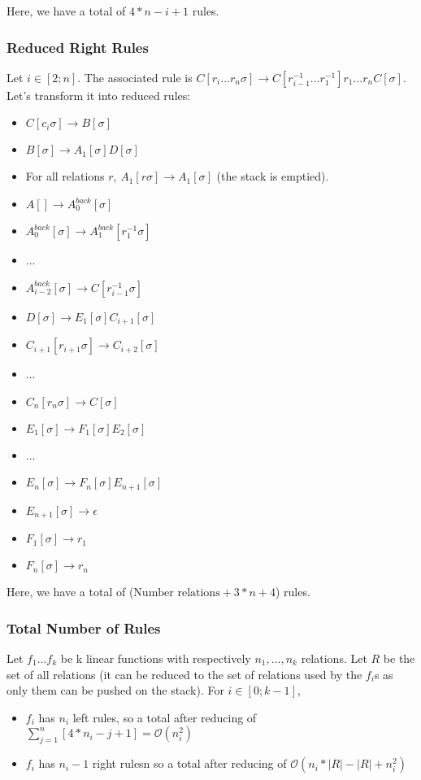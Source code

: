 \documentclass[10pt,a4paper,draft]{article}
\begin{document}
Here, we have a total of $4 * n - i + 1$ rules.

\subsubsection{Reduced Right Rules}
\label{reducedrightrules}

Let $i \in [2; n]$. The associated rule is $C[r_i ... r_n \sigma] \rightarrow C[r_{i-1}^{-1} ... r_1^{-1}] r_1 ... r_n C[\sigma]$. Let's transform it into reduced rules:
\begin{itemize}
\item $C[c_i \sigma] \rightarrow B[\sigma]$
\item $B[\sigma] \rightarrow A_1[\sigma] D[\sigma]$
\item For all relations $r$, $A_1[r \sigma] \rightarrow A_1[\sigma]$ (the stack is emptied).
\item $A[] \rightarrow A^{back}_{0}[\sigma]$
\item $A^{back}_{0}[\sigma] \rightarrow A^{back}_{1}[r_1^{-1} \sigma]$
\item ...
\item $A^{back}_{i-2}[\sigma] \rightarrow C[r_{i-1}^{-1} \sigma]$
\item $D[\sigma] \rightarrow E_1[\sigma]C_{i+1}[\sigma]$
\item $C_{i+1}[r_{i+1} \sigma] \rightarrow C_{i+2}[\sigma]$
\item ...
\item $C_{n}[r_{n} \sigma] \rightarrow C[\sigma]$
\item $E_1[\sigma] \rightarrow F_1[\sigma] E_2[\sigma]$
\item ...
\item $E_n[\sigma] \rightarrow F_n[\sigma] E_{n+1}[\sigma]$
\item $E_{n+1}[\sigma] \rightarrow \epsilon$
\item $F_1[\sigma] \rightarrow r_1$
\item $F_n[\sigma] \rightarrow r_n$
\end{itemize}

Here, we have a total of ($\textrm{Number relations} + 3 * n + 4$) rules.

\subsubsection{Total Number of Rules}

Let $f_1 ... f_k$ be k linear functions with respectively $n_1, ..., n_k$ relations. Let $R$ be the set of all relations (it can be reduced to the set of relations used by the $f_i$s as only them can be pushed on the stack). For $i \in [0; k-1]$,
\begin{itemize}
\item $f_i$ has $n_i$ left rules, so a total after reducing of $\sum\limits_{j=1}^n [4 * n_i - j + 1] = \mathcal{O}(n_i^2)$
\item $f_i$ has $n_i - 1$ right rulesn so a total after reducing of $\mathcal{O}(n_i * |R| - |R| + n_i^2)$
\end{itemize}
\end{document}
